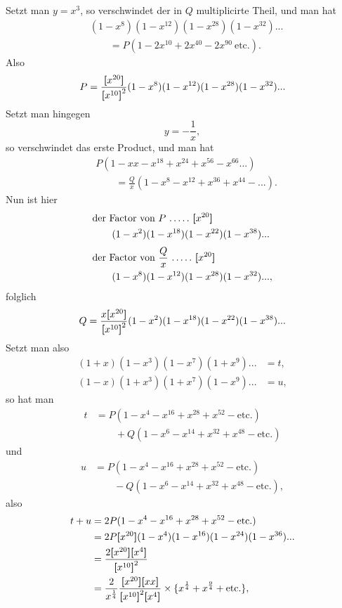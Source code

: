\par\indent Setzt man $y=x^3$, so verschwindet der in $Q$ multiplicirte Theil, und man hat
\[\begin{aligned}
&(1-x^8)(1-x^{12})(1-x^{28})(1-x^{32}){.}{.}{.}\\
&\qquad=P(1-2x^{10}+2x^{40}-2x^{90}\ \text{etc.}).
\end{aligned}\]
\noindent Also
\[
P=\frac{\boldsymbol{[}x^{20}\boldsymbol{]}}{\boldsymbol{[}x^{10}\boldsymbol{]}^2}(1-x^8)(1-x^{12})(1-x^{28})(1-x^{32}){.}{.}{.}
\]
\noindent Setzt man hingegen
\[
y=-\frac1x,
\]
\noindent so verschwindet das erste Product, und man hat
\clearpage
{}
\[\begin{aligned}
&P(1-xx-x^{18}+x^{24}+x^{56}-x^{66}{.}{.}{.})\\
&\qquad=\frac Qx(1-x^8-x^{12}+x^{36}+x^{44}-{.}{.}{.}).
\end{aligned}\]
\noindent Nun ist hier
\[\begin{aligned}
&\text{der Factor von }P\ { .}\,{.}\,{.}\,{.}\,{.}\ \TransBracket{x^{20}}\\
&\qquad(1-x^2)(1-x^{18})(1-x^{22})(1-x^{38}){.}{.}{.}\\[.6ex]
&\text{der Factor von }\frac Qx\ { .}\,{.}\,{.}\,{.}\,{.}\ \TransBracket{x^{20}}\\
&\qquad(1-x^8)(1-x^{12})(1-x^{28})(1-x^{32}){.}{.}{.},
\end{aligned}\]
\noindent folglich
\[
Q=\frac{x\boldsymbol{[}x^{20}\boldsymbol{]}}{\boldsymbol{[}x^{10}\boldsymbol{]}^2}(1-x^2)(1-x^{18})(1-x^{22})(1-x^{38}){.}{.}{.}
\]
\noindent Setzt man also
\[\begin{aligned}
(1+x)(1-x^3)(1-x^7)(1+x^9){.}{.}{.}&=t,\\
(1-x)(1+x^3)(1+x^7)(1-x^9){.}{.}{.}&=u,
\end{aligned}\]
\noindent so hat man
\[\begin{aligned}
t&=P(1-x^4-x^{16}+x^{28}+x^{52}-\text{etc.})\\
&\qquad+Q(1-x^6-x^{14}+x^{32}+x^{48}-\text{etc.})
\end{aligned}\]
\noindent und
\[\begin{aligned}
u&=P(1-x^4-x^{16}+x^{28}+x^{52}-\text{etc.})\\
&\qquad-Q(1-x^6-x^{14}+x^{32}+x^{48}-\text{etc.}),
\end{aligned}\]
\noindent also
\[\begin{aligned}
t+u&=2P(1-x^4-x^{16}+x^{28}+x^{52}-\text{etc.})\\
&=2P\boldsymbol{[}x^{20}\boldsymbol{]}(1-x^4)(1-x^{16})(1-x^{24})(1-x^{36}){.}{.}{.}\\
&=\frac{2\boldsymbol{[}x^{20}\boldsymbol{]}\boldsymbol{[}x^4\boldsymbol{]}}{\boldsymbol{[}x^{10}\boldsymbol{]}^2}\\
&=\frac2{x^{\frac14}}\frac{\boldsymbol{[}x^{20}\boldsymbol{]}\boldsymbol{[}xx\boldsymbol{]}}{\boldsymbol{[}x^{10}\boldsymbol{]}^2\boldsymbol{[}x^4\boldsymbol{]}}\times\{x^{\frac14}+x^{\frac94}+\text{etc.}\},
\end{aligned}\]
